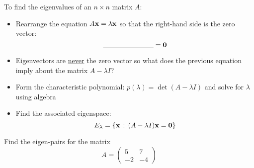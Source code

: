 \begin{technique}
    To find the eigenvalues of an $n \times n$ matrix $A$:
        \begin{itemize}
            \item Rearrange the equation $A {\bf x} = \lambda {\bf x}$ so that the right-hand side
                is the zero vector: 
                \[ \underline{\hspace{1in}} = {\bf 0} \]
            \item Eigenvectors are \underline{never} the zero vector so what does the
                previous equation imply about the matrix $A - \lambda I$?
            \item Form the characteristic polynomial: $p(\lambda) = \det(A-\lambda I)$ and
                solve for $\lambda$ using algebra
            \item Find the associated eigenspace: 
                \[ E_\lambda = \{ {\bf x} \, : \, (A - \lambda I) {\bf x} = {\bf 0} \} \]
        \end{itemize}

\end{technique}



\begin{problem}
    Find the eigen-pairs for the matrix
    \[ A = \begin{pmatrix} 5 & 7 \\ -2 & -4 \end{pmatrix} \]
\end{problem}
\solution{
    \[ \lambda_1 = -2, \quad \bv_1 = \begin{pmatrix} 1 \\ -1 \end{pmatrix} \qquad
    \lambda_2 = 3, \quad \bv_2 = \begin{pmatrix} 7 \\ -2 \end{pmatrix} \]
}

